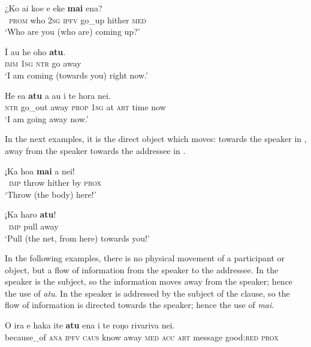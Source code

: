 \ea\label{ex:7.122}
\gll ¿Ko ai koe e eke \textbf{mai} ena? \\
~\textsc{prom} who \textsc{2sg} \textsc{ipfv} go\_up hither \textsc{med} \\

\glt 
‘Who are you (who are) coming up?’ \textstyleExampleref{[R304.084]} 
\z

\ea\label{ex:7.123}
\gll {\ꞌ}Ī au he oho \textbf{atu}.\\
\textsc{imm} \textsc{1sg} \textsc{ntr} go away\\

\glt 
‘I am coming (towards you) right now.’ \textstyleExampleref{[R152.010]} 
\z

\ea\label{ex:7.124}
\gll He e{\ꞌ}a \textbf{atu} a au {\ꞌ}i te hora nei.\\
\textsc{ntr} go\_out away \textsc{prop} \textsc{1sg} at \textsc{art} time now\\

\glt
‘I am going away now.’ \textstyleExampleref{[R245.017]} 
\z

In the next examples, it is the direct object which moves: towards the speaker in , away from the speaker towards the addressee in . 

\ea\label{ex:7.125}
\gll ¡Ka hoa \textbf{mai} a nei! \\
~\textsc{imp} throw hither by \textsc{prox} \\

\glt 
‘Throw (the body) here!’ \textstyleExampleref{[R304.060]} 
\z

\ea\label{ex:7.126}
\gll ¡Ka haro \textbf{atu}! \\
~\textsc{imp} pull away \\

\glt
‘Pull (the net, from here) towards you!’ \textstyleExampleref{[R304.135]} 
\z

In the following examples, there is no physical movement of a participant or object, but a flow of information from the speaker to the addressee. In  the speaker is the subject, so the information moves away from the speaker; hence the use of \textit{atu}. In  the speaker is addressed by the subject of the clause, so the flow of information is directed towards the speaker; hence the use of \textit{mai}.

\ea\label{ex:7.127}
\gll {\ꞌ}O ira e haka {\ꞌ}ite \textbf{atu} ena i te roŋo rivariva nei. \\
because\_of \textsc{ana} \textsc{ipfv} \textsc{caus} know away \textsc{med} \textsc{acc} \textsc{art} message good:\textsc{red} \textsc{prox} \\

